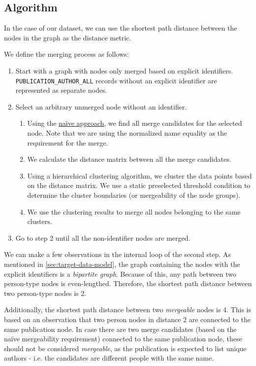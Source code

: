 \subsection{Algorithm}\label{sec:distance-based-hierarchical-clustering}

In the case of our dataset, we can use the shortest path distance between the nodes in the graph as the distance metric.

We define the merging process as follows:

\begin{enumerate}
    \item Start with a graph with nodes only merged based on explicit identifiers. \texttt{PUBLICATION\_AUTHOR\_ALL} records without an explicit identifier are represented as separate nodes.
    \item Select an arbitrary unmerged node without an identifier.
    \begin{enumerate}
        \item Using the \hyperref[sec:naive-approach]{naïve approach}, we find all merge candidates for the selected node. Note that we are using the normalized name equality as the requirement for the merge.
        \item We calculate the distance matrix between all the merge candidates.
        \item Using a hierarchical clustering algorithm, we cluster the data points based on the distance matrix. 
        We use a static preselected threshold condition to determine the cluster boundaries (or mergeability of the node groups).
        \item We use the clustering results to merge all nodes belonging to the same clusters.
    \end{enumerate}
    \item Go to step 2 until all the non-identifier nodes are merged.
\end{enumerate}

We can make a few observations in the internal loop of the second step.
As mentioned in \ref{sec:target-data-model}, the graph containing the nodes with the explicit identifiers is a \textit{bipartite graph}.
Because of this, any path between two person-type nodes is even-lengthed.
Therefore, the shortest path distance between two person-type nodes is 2.

Additionally, the shortest path distance between two \textit{mergeable} nodes is 4.
This is based on an observation that two person nodes in distance 2 are connected to the same publication node.
In case there are two merge candidates (based on the naïve mergeability requirement) connected to the same publication node,
these should not be considered \textit{mergeable}, as the publication is expected to list unique authors - i.e. the candidates are
different people with the same name.

